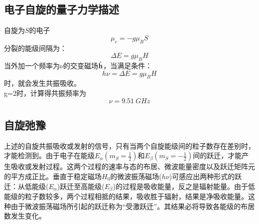 \documentclass[a4paper]{article}
\begin{document}
\subsection{电子自旋的量子力学描述}
自旋为$ S $的电子
\begin{equation}
\mu_e = -g\mu_BS             \label{eq11}
\end{equation}
分裂的能级间隔为：
\begin{equation}
\Delta E = g\mu_B H          \label{eq12}
\end{equation}
当外加一个频率为$\nu$的交变磁场$\tilde{\vb{h}}$，当满足条件：
\begin{equation}
h\nu = \Delta E = g\mu_B H   \label{eq13}
\end{equation}
时，就会发生共振吸收。\\
g=2时，计算得共振频率为
\begin{equation}\label{key}
\nu = \SI{9.51}{GHz}
\end{equation}

\subsection{自旋弛豫}
上述的自旋共振吸收或发射的信号，只有当两个自旋能级间的粒子数存在差别时，才能检测到。由于电子在能级$E_{\alpha}(m_S = \frac{1}{2})$和$E_{\beta}(m_S = -\frac{1}{2})$间的跃迁，才能产生吸收或发射过程。这两个过程的速率与态的布居、微波能量密度以及跃迁矩阵元的平方成正比。垂直于稳定磁场$H_0$的微波振荡磁场($h\nu$)可感应出两种形式的跃迁：从低能级($E_{\alpha}$)跃迁至高能级($E_{\beta}$)的过程是吸收能量，反之是辐射能量。由于低能级的粒子数较多，两个过程相抵的结果，吸收胜于辐射，结果是净吸收能量。这种由于微波振荡磁场所引起的跃迁称为“受激跃迁”。其结果必将导致各能级的布居数发生变化。
\end{document}
